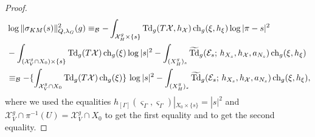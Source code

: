 \documentclass[amscd, leqno]{amsart}
\theoremstyle{plain}
\theoremstyle{definition}
\theoremstyle{remark}
\newenvironment{pf}{\begin{proof}}{\end{proof}}
\begin{document}
\begin{pf}
\begin{equation}
\label{eqn:KM}
\begin{aligned}
\,
&
\log\|\sigma_{KM}(s)\|^{2}_{Q,\lambda_{G}}(g)
\equiv_{\mathcal B}
-
\int_{{\mathcal X}^{g}_{H}\times\{s\}} {\rm Td}_{g}(T{\mathcal X},h_{\mathcal X})\,{\rm ch}_{g}(\xi,h_{\xi}) \log|\pi-s|^{2}
\\
&
-\int_{({\mathcal X}^{g}_{V}\cap X_{0})\times\{s\}} {\rm Td}_{g}(T{\mathcal X})\,{\rm ch}_{g}(\xi)\log|s|^{2}
-\int_{(X^{g}_{H})_{s}} \widetilde{\rm Td}_{g}({\mathcal E}_{s};\,h_{X_{s}},h_{\mathcal X},a_{N_{s}})\,{\rm ch}_{g}(\xi,h_{\xi})
\\
&\equiv_{\mathcal B} -\{\int_{{\mathcal X}^{g}_{V}\cap X_{0}}{\rm Td}_{g}(T{\mathcal X})\,{\rm ch}_{g}(\xi)\}\,\log|s|^{2}
-
\int_{(X^{g}_{H})_{s}} \widetilde{\rm Td}_{g}({\mathcal E}_{s};\,h_{X_{s}},h_{\mathcal X},a_{N_{s}})\,{\rm ch}_{g}(\xi,h_{\xi}),
\end{aligned}
\end{equation}
where we used the equalities $h_{[\Gamma]}(\varsigma_{\Gamma},\varsigma_{\Gamma})|_{X_{0}\times\{s\}}=|s|^{2}$ and 
${\mathcal X}_{V}^{g}\cap\pi^{-1}(U)={\mathcal X}_{V}^{g}\cap X_{0}$ to get the first equality and \cite[Th.\,9.1]{Yoshikawa07} 
to get the second equality. 



\end{pf}
\end{document}
